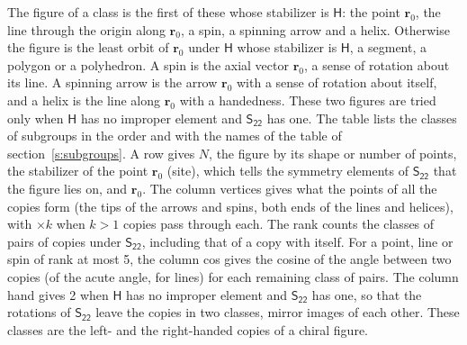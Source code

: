 \documentclass[10pt,a4paper]{article}
\numberwithin{equation}{section}
\newcommand{\grp}[1]{\mathsf{#1}}
\newcommand{\pointr}{\mathbf{r}}
\begin{document}
\leavevmode\label{n:head.figure}The figure of a class is the first of these whose stabilizer is $\grp{H}$: the point $\pointr_0$, the line through the origin along $\pointr_0$, a spin, a spinning arrow and a helix. Otherwise the figure is the least orbit of $\pointr_0$ under $\grp{H}$ whose stabilizer is $\grp{H}$, a segment, a polygon or a polyhedron. A spin is the axial vector $\pointr_0$, a sense of rotation about its line. A spinning arrow is the arrow $\pointr_0$ with a sense of rotation about itself, and a helix is the line along $\pointr_0$ with a handedness. These two figures are tried only when $\grp{H}$ has no improper element and $\grp{S_{22}}$ has one. The table lists the classes of subgroups in the order and with the names of the table of section~\ref{s:subgroups}. \label{n:head.site}A row gives $N$, the figure by its shape or number of points, the stabilizer of the point $\pointr_0$ (site), which tells the symmetry elements of $\grp{S_{22}}$ that the figure lies on, and $\pointr_0$. \label{n:head.vertices}The column vertices gives what the points of all the copies form (the tips of the arrows and spins, both ends of the lines and helices), with ${\times}k$ when $k > 1$ copies pass through each. \label{n:head.rank}The rank counts the classes of pairs of copies under $\grp{S_{22}}$, including that of a copy with itself. \label{n:head.cos}For a point, line or spin of rank at most 5, the column cos gives the cosine of the angle between two copies (of the acute angle, for lines) for each remaining class of pairs. \label{n:head.hand}The column hand gives 2 when $\grp{H}$ has no improper element and $\grp{S_{22}}$ has one, so that the rotations of $\grp{S_{22}}$ leave the copies in two classes, mirror images of each other. These classes are the left- and the right-handed copies of a chiral figure.
\end{document}
